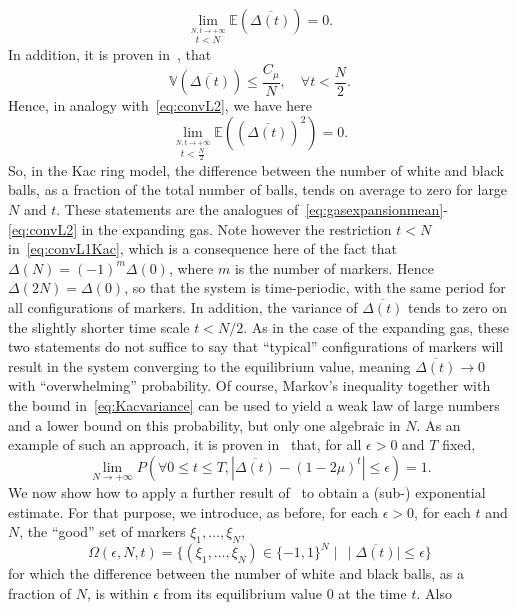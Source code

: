 \documentclass{article}
\newcommand {\E}{\mathbb{E}}
\newcommand {\V}{\mathbb{V}}
\numberwithin{equation}{section}
\begin{document}
\begin{equation}\label{eq:convL1Kac}
\lim_{\stackrel{N,t\to+\infty}{t<N}}\E\left(\overline{\Delta(t)}\right)=0.
\end{equation}
In addition, it is proven in~\cite{Ka59, GoOl09}, that
\begin{equation}\label{eq:Kacvariance}
\V(\overline{\Delta(t)})\leq \frac{C_\mu}{N}, \quad \forall t<\frac{N}2.
\end{equation}
Hence, in analogy with~\eqref{eq:convL2}, we have here
\begin{equation}\label{eq:convL2Kac}
\lim_{\stackrel{N,t\to +\infty}{t<\frac{N}2}}\E\left(\left(\overline{\Delta(t)}\right)^2\right)=0.
\end{equation}
So, in the Kac ring model, the difference between the number of white and black balls, as a fraction of the total number of balls, tends on average to zero for large $N$ and $t$.  These statements are the analogues of~\eqref{eq:gasexpansionmean}-\eqref{eq:convL2} in the expanding gas. Note however the restriction $t<N$ in~\eqref{eq:convL1Kac}, which is a consequence here of the fact that $\Delta(N)=(-1)^m\Delta(0)$, where $m$ is the number of markers. Hence $\Delta(2N)=\Delta(0)$, so that the system is time-periodic, with the same period for all configurations of markers. In addition, the variance of $\overline{\Delta(t)}$ tends to zero on the slightly shorter time scale $t<N/2$. As in the case of the expanding gas, these two statements do not suffice to say that ``typical'' configurations of markers will result in the system converging to the equilibrium value, meaning $\overline{\Delta(t)}\to 0$ with ``overwhelming'' probability. Of course, Markov's inequality together with the bound in~\eqref{eq:Kacvariance} can be used to yield a weak law of large numbers and a lower bound on this probability, but only one algebraic in $N$. As an example of such an approach, it is proven in~\cite{MaNeSh09} that, for all $\epsilon>0$ and  $T$ fixed,
$$
\lim_{N\to+\infty}P(\forall 0\leq t\leq T, |\overline{\Delta(t)}-(1-2\mu)^t|\leq \epsilon)=1.
$$
We now show how to apply a further result of~\cite{Ho63} to obtain a (sub-) exponential estimate.
For that purpose, we introduce, as before, for each $\epsilon>0$, for each $t$ and $N$,  the ``good'' set of markers $\xi_1,\dots, \xi_N$,
\begin{equation}\label{eq:Kacgoodsets}
\Omega(\epsilon, N, t)=\{(\xi_1, \dots, \xi_N)\in\{-1,1\}^N\mid\, \mid\overline{\Delta(t)}\mid\leq \epsilon\}
\end{equation}
for which the difference between the number of white and black balls, as a fraction of $N$, is within $\epsilon$ from its equilibrium value $0$ at the time $t$. Also
\end{document}
